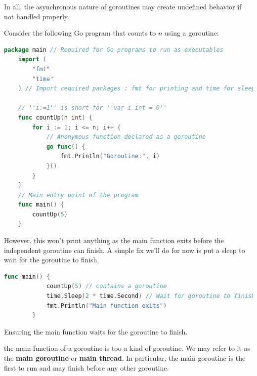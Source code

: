 \noindent
In all, the asynchronous nature of goroutines may create undefined behavior if not handled properly.
\begin{Example}

    \label{ex:goroutine}
    Consider the following Go program that counts to $n$ using a goroutine:
    \begin{lstlisting}[language=Go, caption=Goroutine Example: Count to n, label={lst:goroutine}, numbers=none]
    package main // Required for Go programs to run as executables
    import (
        "fmt"
        "time"
    ) // Import required packages : fmt for printing and time for sleep
    
    // ''i:=1'' is short for ''var i int = 0''
    func countUp(n int) {
        for i := 1; i <= n; i++ {
            // Anonymous function declared as a goroutine
            go func() {
                fmt.Println("Goroutine:", i)
            }()
        }
    }
    // Main entry point of the program
    func main() {
        countUp(5)
    }
    \end{lstlisting}
    \noindent
    However, this won't print anything as the main function exits before the independent goroutine can finish. A simple fix we'll do for now is put a sleep to wait for the goroutine to finish.
    \begin{lstlisting}[language=Go, caption=Adding a Sleep to Wait for Goroutine, label={lst:sleep}, numbers=none]
        func main() {
            countUp(5) // contains a goroutine
            time.Sleep(2 * time.Second) // Wait for goroutine to finish
            fmt.Println("Main function exits")
        }
    \end{lstlisting}

    Ensuring the main function waits for the goroutine to finish.
\end{Example}

\begin{theo}

    the main function of a goroutine is too a kind of goroutine. We may refer to it as the \textbf{main goroutine} or \textbf{main thread}.
    In particular, the main goroutine is the first to run and may finish before any other goroutine.
\end{theo}


\newpage 

